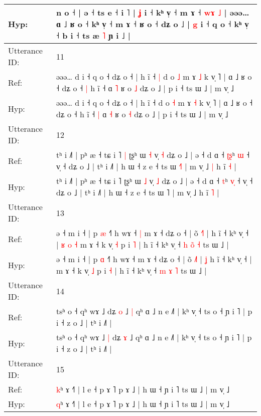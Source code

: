 \documentclass[10pt]{article}
\DeclareRobustCommand{\hl}[1]{{\textcolor{red}{#1}}}
\begin{document}
\begin{longtable}{ll}
 \\
Hyp: & n o ˧ | ə ˧ ts e ˧\hl{}\hl{} i ˥ | \hl{ʝ} i\hl{} ˧ kʰ v̩ ˧\hl{}\hl{} m ɤ ˧ \hl{}\hl{w}\hl{ɤ} \hl{˩} | əəə… ɑ ˩ ʁ o ˧\hl{}\hl{} kʰ v̩ ˧ m ɤ ˧ ʁ o ˧ dʑ o ˩ | \hl{g} i ˧ q o ˧\hl{}\hl{} kʰ v̩ ˧ b i ˧ ts æ \hl{˥} ɲ i ˩ |
 \\
\midrule
Utterance ID: & 11 \\
Ref: & əəə… d i ˧ q o ˧ dʑ o ˧ | h ĩ ˧\hl{ }\hl{|} d o \hl{˩} m ɤ \hl{˩} k v̩ ˥ | ɑ ˩ ʁ o ˧ dʑ o ˧\hl{ }\hl{|} h ĩ ˧\hl{}\hl{} ɑ \hl{˥} ʁ o \hl{˩} dʑ o ˩ | p i ˧ ts ɯ ˩ | m v̩ ˩
 \\
Hyp: & əəə… d i ˧ q o ˧ dʑ o ˧ | h ĩ ˧\hl{}\hl{} d o \hl{˧} m ɤ \hl{˧} k v̩ ˥ | ɑ ˩ ʁ o ˧ dʑ o ˧\hl{}\hl{} h ĩ ˧\hl{ }\hl{|} ɑ \hl{˧} ʁ o \hl{˧} dʑ o ˩ | p i ˧ ts ɯ ˩ | m v̩ ˩
 \\
\midrule
Utterance ID: & 12 \\
Ref: & tʰ i ˩˥ | pʰ æ ˧ tɕ i ˥\hl{ }\hl{|} ʈʂʰ ɯ \hl{˧} v̩ \hl{˧} dʑ o ˩ | ə ˧ d ɑ ˧ \hl{ʈ}\hl{ʂ}ʰ \hl{}\hl{ɯ} ˧ v̩ ˧ dʑ o ˩ | tʰ i ˩˥ | h ɯ ˧ z e ˧ ts ɯ \hl{˧}˥ | m v̩ ˩\hl{ }\hl{|} h ĩ \hl{˧} |
 \\
Hyp: & tʰ i ˩˥ | pʰ æ ˧ tɕ i ˥\hl{}\hl{} ʈʂʰ ɯ \hl{˩} v̩ \hl{˩} dʑ o ˩ | ə ˧ d ɑ ˧ \hl{}\hl{t}ʰ \hl{v}\hl{̩} ˧ v̩ ˧ dʑ o ˩ | tʰ i ˩˥ | h ɯ ˧ z e ˧ ts ɯ \hl{}˥ | m v̩ ˩\hl{}\hl{} h ĩ \hl{˥} |
 \\
\midrule
Utterance ID: & 13 \\
Ref: & ə ˧ m i ˧ | p \hl{æ} ˧˥ h wɤ ˧\hl{ }\hl{|} m ɤ ˧ dʑ o ˧ | õ \hl{˧}˥ |\hl{}\hl{} h ĩ ˧ kʰ v̩ ˧ |\hl{ }\hl{ʁ}\hl{ }\hl{o}\hl{ }\hl{˧} m ɤ ˧ k v̩ \hl{˧} p i \hl{˥} | h ĩ ˧ kʰ v̩ ˧ \hl{h} \hl{o}\hl{̃} \hl{˧} ts ɯ ˩ |
 \\
Hyp: & ə ˧ m i ˧ | p \hl{ɑ} ˧˥ h wɤ ˧\hl{}\hl{} m ɤ ˧ dʑ o ˧ | õ \hl{˩}˥ |\hl{ }\hl{ʝ} h ĩ ˧ kʰ v̩ ˧ |\hl{}\hl{}\hl{}\hl{}\hl{}\hl{} m ɤ ˧ k v̩ \hl{˩} p i \hl{˧} | h ĩ ˧ kʰ v̩ ˧ \hl{m} \hl{}\hl{ɤ} \hl{˥} ts ɯ ˩ |
 \\
\midrule
Utterance ID: & 14 \\
Ref: & tsʰ o ˧ qʰ wɤ ˩\hl{}\hl{} dʑ \hl{o} ˩\hl{ }\hl{|} qʰ ɑ ˩ n e ˩˥ | kʰ v̩ ˧ ts o ˧ ɲ i ˥ | p i ˧ z o ˩ | tʰ i ˩˥ |
 \\
Hyp: & tsʰ o ˧ qʰ wɤ ˩\hl{ }\hl{|} dʑ \hl{ɤ} ˩\hl{}\hl{} qʰ ɑ ˩ n e ˩˥ | kʰ v̩ ˧ ts o ˧ ɲ i ˥ | p i ˧ z o ˩ | tʰ i ˩˥ |
 \\
\midrule
Utterance ID: & 15 \\
Ref: & \hl{k}ʰ ɤ ˧˥ | l e ˧ p ɤ ˥ p ɤ ˩ | h ɯ ˧ ɲ i ˥ ts ɯ ˩ | m v̩ ˩
 \\
Hyp: & \hl{q}ʰ ɤ ˧˥ | l e ˧ p ɤ ˥ p ɤ ˩ | h ɯ ˧ ɲ i ˥ ts ɯ ˩ | m v̩ ˩

\end{longtable}
\end{document}
